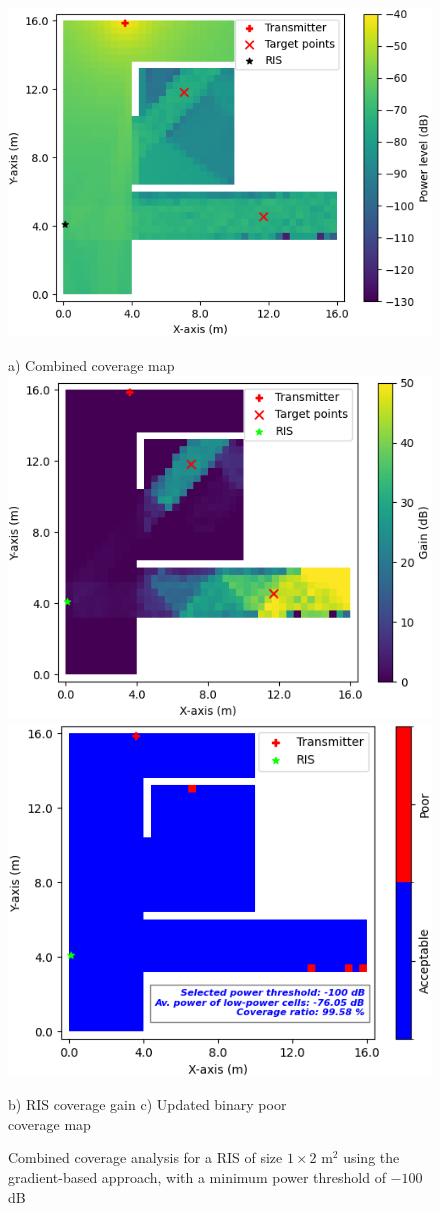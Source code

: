 \documentclass{IEEEoj}
\begin{document}
\begin{figure}
	\centering
	\includegraphics[width=0.8\linewidth]{Sim_Results/Comb_cov_1x2_Gradient.png}
	
	a) Combined coverage map \\[5pt]
	
	\includegraphics[width=0.49\linewidth]{Sim_Results/RIS_cov_gain_1x2_Gradient.png}
	\hfill
	\includegraphics[width=0.48\linewidth]{Sim_Results/New_Binary_Cov_Map_1x2_Gradient.png}
	
	\hspace{10pt} b) RIS coverage gain \hspace{30pt} c) Updated binary poor \\ \hspace{140pt} coverage map
	\caption{Combined coverage analysis for a RIS of size $1 \times 2$ m$^2$ using the gradient-based approach, with a minimum power threshold of $-100$ dB}
	\label{comb_cov_gradient}
\end{figure}
\end{document}
